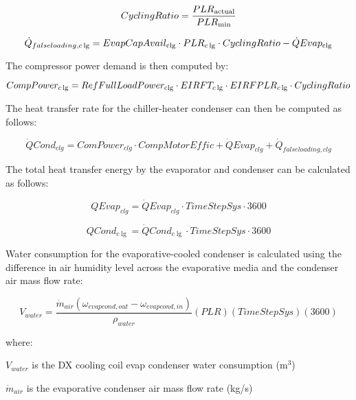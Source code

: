 \begin{equation}
CyclingRatio = \frac{{PL{R_{{\rm{actual}}}}}}{{PL{R_{{\rm{min}}}}}}
\end{equation}

\begin{equation}
{\dot Q_{falseloading,c\lg }} = EvapCapAvai{l_{{\rm{clg}}}} \cdot PL{R_{c\lg }} \cdot CyclingRatio - \dot QEva{p_{{\rm{clg}}}}
\end{equation}

The compressor power demand is then computed by:

\begin{equation}
CompPowe{r_{c\lg }} = RefFullLoadPowe{r_{{\rm{clg}}}} \cdot {\rm{ }}EIRF{T_{c\lg }}{\rm{ }} \cdot EIRFPL{R_{c\lg }} \cdot CyclingRatio
\end{equation}

The heat transfer rate for the chiller-heater condenser can then be computed as follows:

\begin{equation}
\dot QCon{d_{clg}} = ComPowe{r_{clg}} \cdot CompMotorEffic + \dot QEva{p_{clg}} + {\dot Q_{falseloading,clg}}
\end{equation}

The total heat transfer energy by the evaporator and condenser can be calculated as follows:

\begin{equation}
QEva{p_{clg}} = \dot QEva{p_{clg}} \cdot TimeStepSys \cdot 3600
\end{equation}

\begin{equation}
QCon{d_{c\lg }} = \dot QCon{d_{c\lg }} \cdot TimeStepSys \cdot 3600
\end{equation}

Water consumption for the evaporative-cooled condenser is calculated using the difference in air humidity level across the evaporative media and the condenser air mass flow rate:

\begin{equation}
{V_{water}} = \frac{{{{\dot{m}_{air}}\left( {{\omega_{evapcond,out}} - {\omega_{evapcond,in}}} \right)}}}{{{\rho_{water}}}}\left( {PLR} \right)\left( {TimeStepSys} \right)\left( {3600} \right)
\end{equation}

where:

\({V_{water}}\) is the DX cooling coil evap condenser water consumption (m\(^{3}\))

\({\dot{m}_{air}}\) is the evaporative condenser air mass flow rate (kg/s)

